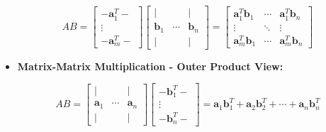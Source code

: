 \documentclass{article}
\begin{document}
\begin{itemize}
    \begin{equation}
        AB =
        \left[
            \begin{array}{c}
                - \mathbf{a}_1^T - \\
                \vdots \\
                - \mathbf{a}_m^T -
            \end{array}
        \right]
        \left[
            \begin{array}{ccc}
                | &        & | \\
                \mathbf{b}_1 & \cdots & \mathbf{b}_n \\
                | &        & |
            \end{array}
        \right]
        =
        \left[
            \begin{array}{ccc}
                \mathbf{a}_1^T \mathbf{b}_1 & \cdots & \mathbf{a}_1^T \mathbf{b}_n \\
                \vdots & \ddots & \vdots \\
                \mathbf{a}_m^T \mathbf{b}_1 & \cdots & \mathbf{a}_m^T \mathbf{b}_n
            \end{array}
        \right]
        \label{eq:mul_inner}
    \end{equation}

    \item \textbf{Matrix-Matrix Multiplication - Outer Product View:}

    \begin{equation}
        AB =
        \left[
            \begin{array}{ccc}
                | &        & | \\
                \mathbf{a}_1 & \cdots & \mathbf{a}_n \\
                | &        & |
            \end{array}
        \right]
        \left[
            \begin{array}{c}
                - \mathbf{b}_1^T - \\
                \vdots \\
                - \mathbf{b}_n^T -
            \end{array}
        \right]
        =
        \mathbf{a}_1 \mathbf{b}_1^T + \mathbf{a}_2 \mathbf{b}_2^T + \cdots + \mathbf{a}_n \mathbf{b}_n^T
        \label{eq:mul_outer}
    \end{equation}


\end{itemize}
\end{document}
